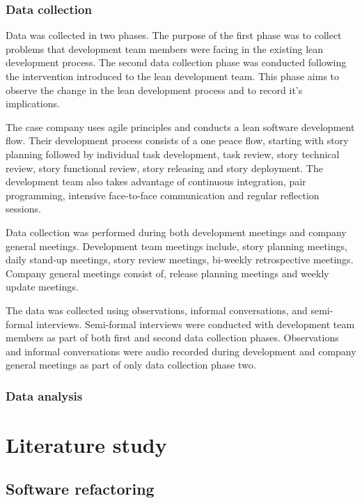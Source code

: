 \documentclass[english,12pt,a4paper,pdftex,sci,utf8]{aaltothesis}
\begin{document}
\subsubsection{Data collection} \label{data collection}
Data was collected in two phases. The purpose of the first phase was to collect problems that development team members were facing in the existing lean development process. The second data collection phase was conducted following the intervention introduced to the lean development team. This phase aims to observe the change in the lean development process and to record it's implications.

The case company uses agile principles and conducts a lean software development flow. Their development process consists of a one peace flow, starting with story planning followed by individual task development, task review, story technical review, story functional review, story releasing and story deployment. The development team also takes advantage of continuous integration, pair programming, intensive face-to-face communication and regular reflection sessions.

Data collection was performed during both development meetings and company general meetings. Development team meetings include, story planning meetings, daily stand-up meetings, story review meetings, bi-weekly retrospective meetings. Company general meetings consist of, release planning meetings and weekly update meetings. 

The data was collected using observations, informal conversations, and semi-formal interviews. Semi-formal interviews were conducted with development team members as part of both first and second data collection phases. Observations and informal conversations were audio recorded during development and company general meetings as part of only data collection phase two.

\subsubsection{Data analysis} \label{data analysis}

\clearpage

\section{Literature study} \label{literature}
\subsection{Software refactoring}
\end{document}
